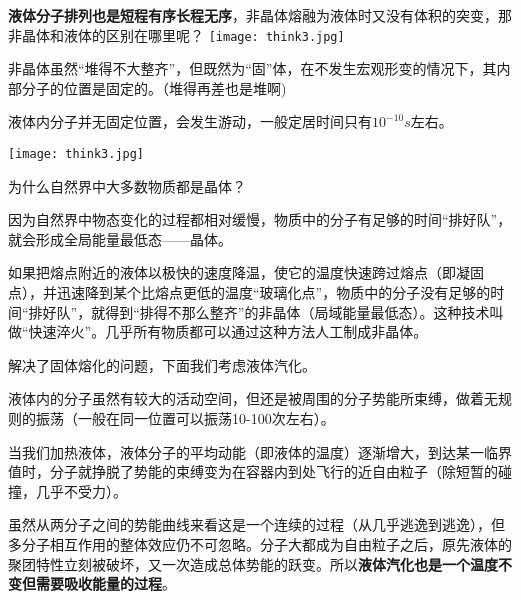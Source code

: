 \documentclass[CJK]{beamer}
\begin{document}
\begin{frame}
\bch
{\bf 液体分子排列也是短程有序长程无序}，非晶体熔融为液体时又没有体积的突变，那非晶体和液体的区别在哪里呢？
\bcenter
\texttt{[image: think3.jpg]}
\ecenter
\ech
\end{frame}

\begin{frame}
\bch
\bitem
\item{非晶体虽然“堆得不大整齐”，但既然为“固”体，在不发生宏观形变的情况下，其内部分子的位置是固定的。（堆得再差也是堆啊\wulian)}
\item{液体内分子并无固定位置，会发生游动，一般定居时间只有$10^{-10}s$左右。}
\eitem
\ech
\end{frame}


\begin{frame}
\bch
\bcenter
\texttt{[image: think3.jpg]}
\ecenter

为什么自然界中大多数物质都是晶体？
\ech

\end{frame}


\begin{frame}
\bch
因为自然界中物态变化的过程都相对缓慢，物质中的分子有足够的时间“排好队”，就会形成全局能量最低态——晶体。

\skipline

如果把熔点附近的液体以极快的速度降温，使它的温度快速跨过熔点（即凝固点），并迅速降到某个比熔点更低的温度“玻璃化点”，物质中的分子没有足够的时间“排好队”，就得到“排得不那么整齐”的非晶体（局域能量最低态）。这种技术叫做“快速淬火”。几乎所有物质都可以通过这种方法人工制成非晶体。

\ech

\end{frame}


\begin{frame}
\bch
解决了固体熔化的问题，下面我们考虑液体汽化。
\ech
\end{frame}

\begin{frame}
\bch
\bitem
\item{液体内的分子虽然有较大的活动空间，但还是被周围的分子势能所束缚，做着无规则的振荡（一般在同一位置可以振荡10-100次左右）。}
\item{当我们加热液体，液体分子的平均动能（即液体的温度）逐渐增大，到达某一临界值时，分子就挣脱了势能的束缚变为在容器内到处飞行的近自由粒子（除短暂的碰撞，几乎不受力）。}
\item{虽然从两分子之间的势能曲线来看这是一个连续的过程（从几乎逃逸到逃逸），但多分子相互作用的整体效应仍不可忽略。分子大都成为自由粒子之后，原先液体的聚团特性立刻被破坏，又一次造成总体势能的跃变。所以{\bf 液体汽化也是一个温度不变但需要吸收能量的过程}。}
\eitem
\ech
\end{frame}
\end{document}
